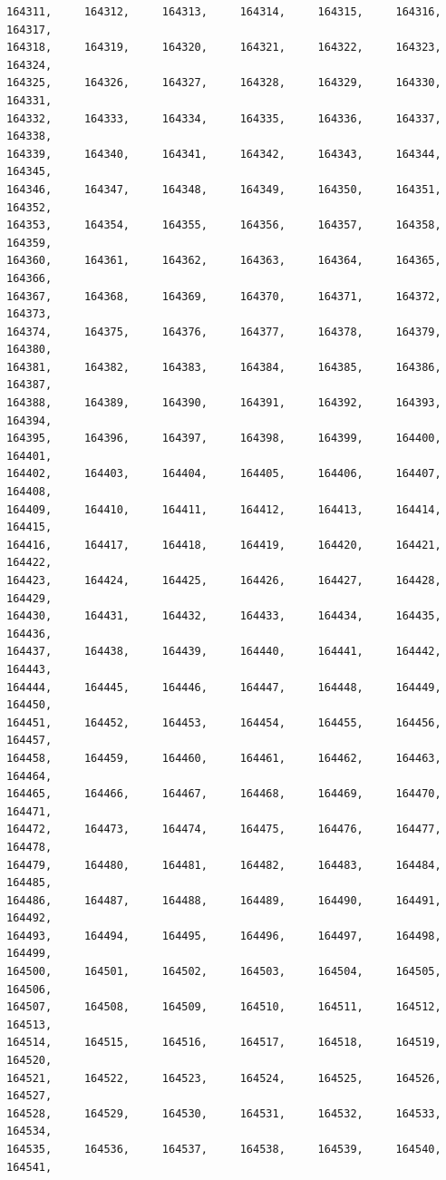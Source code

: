 \documentclass[a4paper,11pt]{report}
\begin{document}
\begin{verbatim}
164311,     164312,     164313,     164314,     164315,     164316,     164317,
164318,     164319,     164320,     164321,     164322,     164323,     164324,
164325,     164326,     164327,     164328,     164329,     164330,     164331,
164332,     164333,     164334,     164335,     164336,     164337,     164338,
164339,     164340,     164341,     164342,     164343,     164344,     164345,
164346,     164347,     164348,     164349,     164350,     164351,     164352,
164353,     164354,     164355,     164356,     164357,     164358,     164359,
164360,     164361,     164362,     164363,     164364,     164365,     164366,
164367,     164368,     164369,     164370,     164371,     164372,     164373,
164374,     164375,     164376,     164377,     164378,     164379,     164380,
164381,     164382,     164383,     164384,     164385,     164386,     164387,
164388,     164389,     164390,     164391,     164392,     164393,     164394,
164395,     164396,     164397,     164398,     164399,     164400,     164401,
164402,     164403,     164404,     164405,     164406,     164407,     164408,
164409,     164410,     164411,     164412,     164413,     164414,     164415,
164416,     164417,     164418,     164419,     164420,     164421,     164422,
164423,     164424,     164425,     164426,     164427,     164428,     164429,
164430,     164431,     164432,     164433,     164434,     164435,     164436,
164437,     164438,     164439,     164440,     164441,     164442,     164443,
164444,     164445,     164446,     164447,     164448,     164449,     164450,
164451,     164452,     164453,     164454,     164455,     164456,     164457,
164458,     164459,     164460,     164461,     164462,     164463,     164464,
164465,     164466,     164467,     164468,     164469,     164470,     164471,
164472,     164473,     164474,     164475,     164476,     164477,     164478,
164479,     164480,     164481,     164482,     164483,     164484,     164485,
164486,     164487,     164488,     164489,     164490,     164491,     164492,
164493,     164494,     164495,     164496,     164497,     164498,     164499,
164500,     164501,     164502,     164503,     164504,     164505,     164506,
164507,     164508,     164509,     164510,     164511,     164512,     164513,
164514,     164515,     164516,     164517,     164518,     164519,     164520,
164521,     164522,     164523,     164524,     164525,     164526,     164527,
164528,     164529,     164530,     164531,     164532,     164533,     164534,
164535,     164536,     164537,     164538,     164539,     164540,     164541,

\end{verbatim}
\end{document}

